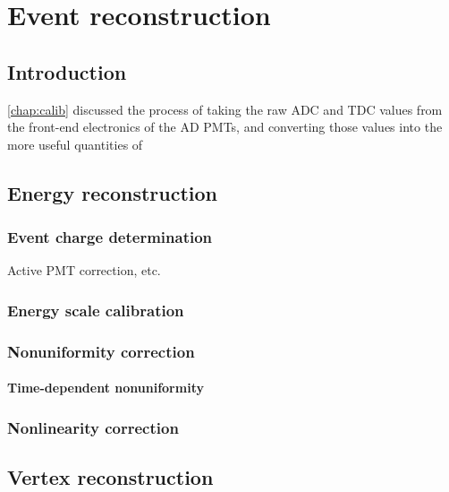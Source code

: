 \documentclass[../thesis.tex]{subfiles}
\begin{document}
\chapter{Event reconstruction}
\label{chap:recon}

\section{Introduction}

\autoref{chap:calib} discussed the process of taking the raw ADC and TDC values from the front-end electronics of the AD PMTs, and converting those values into the more useful quantities of 

\section{Energy reconstruction}
\label{sec:reconEnergy}

\subsection{Event charge determination}
\label{sec:reconEnergyChage}

Active PMT correction, etc.

\subsection{Energy scale calibration}
\label{sec:reconEnergyScale}

\subsection{Nonuniformity correction}
\label{sec:reconEnergyNU}

\subsubsection{Time-dependent nonuniformity}
\label{sec:reconEnergyTDNU}

\subsection{Nonlinearity correction}
\label{sec:reconEnergyNL}

\section{Vertex reconstruction}
\label{sec:reconVertex}
\end{document}
